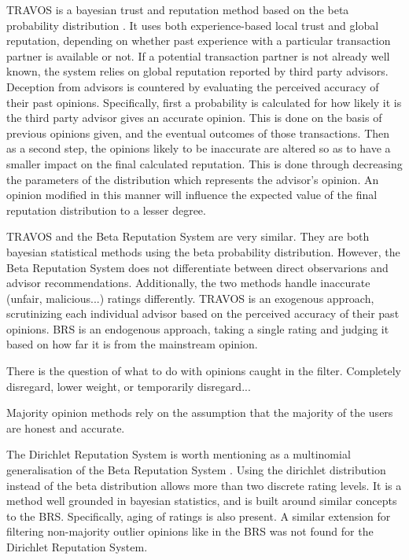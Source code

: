 \documentclass[%
    ]{\PathToTumTemplate/thesis/tum_thesis}
\begin{document}
TRAVOS is a bayesian trust and reputation method based on the beta probability distribution \cite{teacy_travos_2006}. It uses both experience-based local trust and global reputation, depending on whether past experience with a particular transaction partner is available or not. If a potential transaction partner is not already well known, the system relies on global reputation reported by third party advisors. Deception from advisors is countered by evaluating the perceived accuracy of their past opinions. Specifically, first a probability is calculated for how likely it is the third party advisor gives an accurate opinion. This is done on the basis of previous opinions given, and the eventual outcomes of those transactions. Then as a second step, the opinions likely to be inaccurate are altered so as to have a smaller impact on the final calculated reputation. This is done through decreasing the parameters of the distribution which represents the advisor's opinion. An opinion modified in this manner will influence the expected value of the final reputation distribution to a lesser degree.

TRAVOS and the Beta Reputation System are very similar. They are both bayesian statistical methods using the beta probability distribution. However, the Beta Reputation System does not differentiate between direct observarions and advisor recommendations. Additionally, the two methods handle inaccurate (unfair, malicious...) ratings differently. TRAVOS is an exogenous approach, scrutinizing each individual advisor based on the perceived accuracy of their past opinions. BRS is an endogenous approach, taking a single rating and judging it based on how far it is from the mainstream opinion.


There is the question of what to do with opinions caught in the filter. Completely disregard, lower weight, or temporarily disregard...

Majority opinion methods rely on the assumption that the majority of the users are honest and accurate.



The Dirichlet Reputation System is worth mentioning as a multinomial generalisation of the Beta Reputation System \cite{josang_dirichlet_2007}. Using the dirichlet distribution instead of the beta distribution allows more than two discrete rating levels. It is a method well grounded in bayesian statistics, and is built around similar concepts to the BRS. Specifically, aging of ratings is also present. A similar extension for filtering non-majority outlier opinions like in the BRS was not found for the Dirichlet Reputation System.
\end{document}
